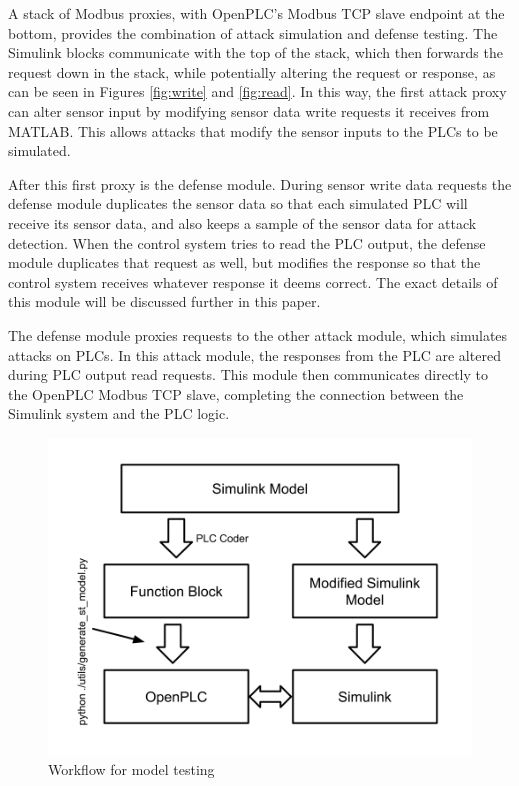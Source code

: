 \documentclass[10pt,twocolumn]{IEEEtran}
\begin{document}
A stack of Modbus proxies, with OpenPLC's Modbus TCP slave endpoint at the bottom, provides the combination of attack simulation and defense testing.
The Simulink blocks communicate with the top of the stack, which then forwards the request down in the stack, while potentially altering the request or response, as can be seen in Figures \ref{fig:write} and \ref{fig:read}.
In this way, the first attack proxy can alter sensor input by modifying sensor data write requests it receives from MATLAB.
This allows attacks that modify the sensor inputs to the PLCs to be simulated.

After this first proxy is the defense module.
During sensor write data requests the defense module duplicates the sensor data so that each simulated PLC will receive its sensor data, and also keeps a sample of the sensor data for attack detection.
When the control system tries to read the PLC output, the defense module duplicates that request as well, but modifies the response so that the control system receives whatever response it deems correct.
The exact details of this module will be discussed further in this paper.

The defense module proxies requests to the other attack module, which simulates attacks on PLCs.
In this attack module, the responses from the PLC are altered during PLC output read requests.
This module then communicates directly to the OpenPLC Modbus TCP slave, completing the connection between the Simulink system and the PLC logic.

\begin{figure}
  \centering
  \includegraphics[width=\columnwidth]{csaw2017workflow.png}
  \caption{Workflow for model testing}
  \label{fig:workflow}
\end{figure}
\end{document}

